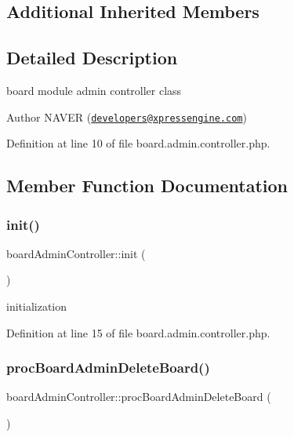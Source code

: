 \subsection*{Additional Inherited Members}


\subsection{Detailed Description}
board module admin controller class 

\begin{DoxyAuthor}{Author}
N\+A\+V\+ER (\href{mailto:developers@xpressengine.com}{\tt developers@xpressengine.\+com}) 
\end{DoxyAuthor}


Definition at line 10 of file board.\+admin.\+controller.\+php.



\subsection{Member Function Documentation}
\mbox{\label{classboardAdminController_a9e73a19f4dd17efa11a5c1340448c75f}} 
\subsubsection{\texorpdfstring{init()}{init()}}
{\footnotesize\ttfamily board\+Admin\+Controller\+::init (\begin{DoxyParamCaption}{ }\end{DoxyParamCaption})}



initialization 



Definition at line 15 of file board.\+admin.\+controller.\+php.

\mbox{\label{classboardAdminController_a1a29957a0a3b7751bff0969dfeae966a}} 
\subsubsection{\texorpdfstring{proc\+Board\+Admin\+Delete\+Board()}{procBoardAdminDeleteBoard()}}
{\footnotesize\ttfamily board\+Admin\+Controller\+::proc\+Board\+Admin\+Delete\+Board (\begin{DoxyParamCaption}{ }\end{DoxyParamCaption})}



